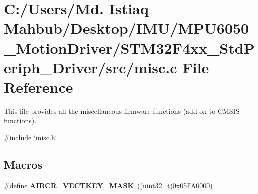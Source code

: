 \section{C\+:/\+Users/\+Md. Istiaq Mahbub/\+Desktop/\+I\+M\+U/\+M\+P\+U6050\+\_\+\+Motion\+Driver/\+S\+T\+M32\+F4xx\+\_\+\+Std\+Periph\+\_\+\+Driver/src/misc.c File Reference}
\label{misc_8c}


This file provides all the miscellaneous firmware functions (add-\/on to C\+M\+S\+IS functions).  


{\ttfamily \#include \char`\"{}misc.\+h\char`\"{}}\newline
\subsection*{Macros}
\begin{DoxyCompactItemize}
\item 
\#define \textbf{ A\+I\+R\+C\+R\+\_\+\+V\+E\+C\+T\+K\+E\+Y\+\_\+\+M\+A\+SK}~((uint32\+\_\+t)0x05\+F\+A0000)
\end{DoxyCompactItemize}
